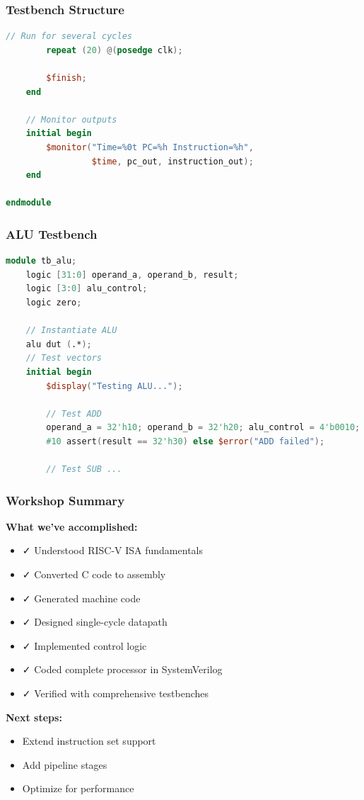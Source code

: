 \documentclass[aspectratio=169,xcolor=dvipsnames]{beamer}
\begin{document}
\begin{frame}[fragile]
\frametitle{Testbench Structure}
\begin{lstlisting}[language=Verilog]
        // Run for several cycles
        repeat (20) @(posedge clk);
        
        $finish;
    end
    
    // Monitor outputs
    initial begin
        $monitor("Time=%0t PC=%h Instruction=%h", 
                 $time, pc_out, instruction_out);
    end
    
endmodule
\end{lstlisting}
\end{frame}



\begin{frame}[fragile]
\frametitle{ALU Testbench}
\begin{lstlisting}[language=Verilog]
module tb_alu;
    logic [31:0] operand_a, operand_b, result;
    logic [3:0] alu_control;
    logic zero;
    
    // Instantiate ALU
    alu dut (.*);    
    // Test vectors
    initial begin
        $display("Testing ALU...");
        
        // Test ADD
        operand_a = 32'h10; operand_b = 32'h20; alu_control = 4'b0010;
        #10 assert(result == 32'h30) else $error("ADD failed");
        
        // Test SUB ...
\end{lstlisting}
\end{frame}


\begin{frame}
\frametitle{Workshop Summary}
\textbf{What we've accomplished:}
\begin{itemize}
    \item ✓ Understood RISC-V ISA fundamentals
    \item ✓ Converted C code to assembly
    \item ✓ Generated machine code
    \item ✓ Designed single-cycle datapath
    \item ✓ Implemented control logic
    \item ✓ Coded complete processor in SystemVerilog
    \item ✓ Verified with comprehensive testbenches
\end{itemize}

\vspace{1em}
\textbf{Next steps:}
\begin{itemize}
    \item Extend instruction set support
    \item Add pipeline stages
    \item Optimize for performance
\end{itemize}
\end{frame}
\end{document}
